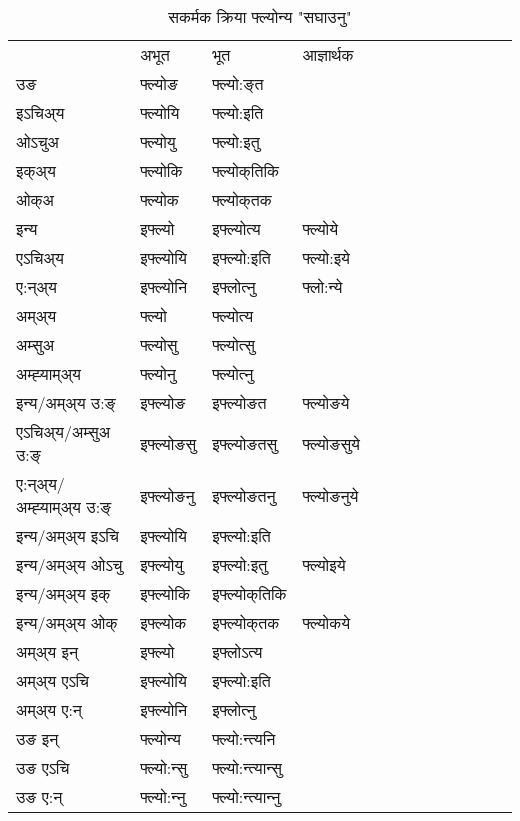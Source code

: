 \begin{table}[H]
\label{o.vt} \centering
\caption{सकर्मक क्रिया  फ्ल्योन्य  "सघाउनु"  }
\begin{tabular}{l|l|l|l|l|l|l|l|l|l|l|l|l}  \toprule
&अभूत & भूत & आज्ञार्थक \\ 
उङ &फ्ल्योङ &फ्ल्यो:ङ्‌त \\ 
इऽचिअ्य &फ्ल्योयि &फ्ल्यो:इति   \\ 
ओऽचुअ &फ्ल्योयु &फ्ल्यो:इतु   \\ 
इक्अ्य &फ्ल्योकि &फ्ल्योक्‌तिकि   \\ 
ओक्अ &फ्ल्योक &फ्ल्योक्‌तक   \\ 
इन्य & इफ्ल्यो & इफ्ल्योत्य &फ्ल्योये  \\ 
एऽचिअ्य & इफ्ल्योयि & इफ्ल्यो:इति &फ्ल्यो:इये    \\ 
ए:न्अ्य & इफ्ल्योनि  & इफ्लोत्‍नु &फ्लो:न्ये  \\ 
अम्अ्य & फ्ल्यो & फ्ल्योत्य   \\ 
अम्सुअ & फ्ल्योसु & फ्ल्योत्सु     \\ 
अम्ह्‍याम्अ्य & फ्ल्योनु  & फ्ल्योत्‍नु \\ 
\midrule
इन्य/अम्अ्य उ:ङ्‌&इफ्ल्योङ &इफ्ल्योङत &फ्ल्योङये \\ 
एऽचिअ्य/अम्सुअ उ:ङ्‌ &इफ्ल्योङसु &इफ्ल्योङतसु &फ्ल्योङसुये \\ 
ए:न्अ्य/अम्ह्‍याम्अ्य उ:ङ्‌ &इफ्ल्योङनु &इफ्ल्योङतनु &फ्ल्योङनुये \\ 
इन्य/अम्अ्य इऽचि &इफ्ल्योयि &इफ्ल्यो:इति    \\ 
इन्य/अम्अ्य ओऽचु &इफ्ल्योयु &इफ्ल्यो:इतु  &फ्ल्योइये  \\ 
इन्य/अम्अ्य इक् &इफ्ल्योकि &इफ्ल्योक्‌तिकि   \\ 
इन्य/अम्अ्य ओक् &इफ्ल्योक &इफ्ल्योक्‌तक  &फ्ल्योकये  \\ 
अम्अ्य इन् & इफ्ल्यो & इफ्लोऽत्य   \\ 
अम्अ्य एऽचि & इफ्ल्योयि & इफ्ल्यो:इति     \\ 
अम्अ्य ए:न् & इफ्ल्योनि  & इफ्लोत्‍नु  \\ 
\midrule
उङ इन् & फ्ल्योन्य  & फ्ल्यो:न्त्यनि  \\ 
उङ एऽचि & फ्ल्यो:न्सु  & फ्ल्यो:न्त्यान्सु   \\ 
उङ ए:न्& फ्ल्यो:न्‍नु  & फ्ल्यो:न्त्यान्‍नु   \\ 
\bottomrule
\end{tabular}
\end{table}


